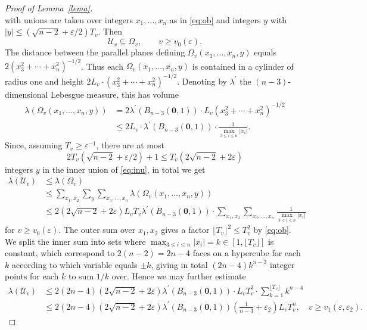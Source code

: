 \documentclass[10pt]{amsart}
\theoremstyle{definition}
\begin{document}
\begin{proof}[Proof of Lemma~\ref{lema}]
\begin{equation}
\end{equation}
with unions are taken over integers $x_1, \dots, x_{n}$ as in \eqref{eq:ob} and integers $y$ with $|y|\le (\sqrt{n-2}+\varepsilon/2)T_v$. Then
\[
\mathcal{U}_v \subseteq \Omega_v, \qquad v\geq v_0(\varepsilon).
\]
The distance between the parallel planes defining $\Omega_v(x_1,\ldots,x_n,y)$ equals
$2(x_3^2+\cdots+x_n^2)^{-1/2}$.
Thus each $\Omega_v(x_1,\ldots,x_n,y)$ is contained in a cylinder
of radius one and height $2L_v \cdot (x_3^2+\cdots+x_n^2)^{-1/2}$. Denoting
by $\lambda^{\prime}$ the $(n-3)$-dimensional Lebesgue measure, this has volume 
\begin{align} \label{volcume calculation}
\lambda(\Omega_v(x_{1},\ldots,x_{n},y))&= 2\lambda^{\prime}(B_{n-3}(\boldsymbol{0},1))\cdot L_v(x_3^2+\cdots+x_n^2)^{-1/2}\nonumber \\ &\le 2 L_v\cdot\lambda^{\prime}(B_{n-3}(\boldsymbol{0},1)) \cdot\frac{ 1}{\max_{3\le i\le n} |x_i|}. 
\end{align}
Since, assuming $T_v\ge \varepsilon^{-1}$,
there are at most $$2T_{v}(\sqrt{n-2}+\varepsilon/2)+1\le T_{v}(2\sqrt{n-2}+2\varepsilon)$$
integers $y$ in the inner union of \eqref{eq:inu}, in 
total we get
\begin{align*}
\lambda(\mathcal{U}_v) &\le \lambda(\Omega_v)\\ &\le 
\sum_{x_1, x_2} \sum_y \sum_{x_3,\ldots,x_n} \lambda(\Omega_v(x_1,\ldots,x_n,y))\\ &\le
 2(2\sqrt{n-2}+2\varepsilon)L_vT_v \lambda^{\prime}(B_{n-3}(\boldsymbol{0},1)) \cdot  \sum_{x_1, x_2} \sum_{x_3,\ldots,x_n} \frac{ 1 }{ \max_{3\le i\le n} |x_i| }
\end{align*}
for $v\ge v_0(\varepsilon)$.
The outer sum over $x_1, x_2$ gives a factor $\lfloor T_v\rfloor^2\le T_v^2$ by \eqref{eq:ob}. We
split the inner sum into sets where $\max_{3\le i\le n} |x_i|=k\in [1,\lfloor T_v\rfloor]$ is constant, which correspond to $2(n-2)=2n-4$ faces
on a hypercube for each $k$ according to which variable equals $\pm k$, giving
in total $(2n-4)k^{n-3}$ integer points for each $k$ to sum $1/k$ over. 
Hence we may further estimate
\begin{align*}
\lambda(\mathcal{U}_v) &\le 2(2n-4)(2\sqrt{n-2}+2\varepsilon) \lambda^{\prime}(B_{n-3}(\boldsymbol{0},1))\cdot  L_v T_v^3 \cdot \sum_{k=1}^{\lfloor T_v\rfloor} k^{n-4}\\ &\le 2(2n-4)(2\sqrt{n-2}+2\varepsilon) \lambda^{\prime}(B_{n-3}(\boldsymbol{0},1)) \left(\frac{1}{n-3}+\varepsilon_2\right) L_v T_v^{n},\quad v\ge v_1(\varepsilon,\varepsilon_2).

\end{align*}
\end{proof}
\end{document}
